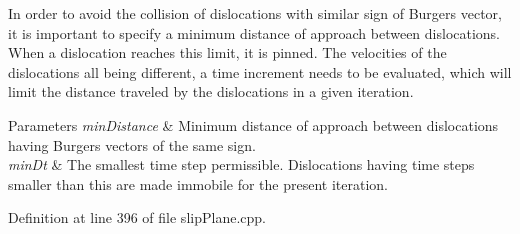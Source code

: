 In order to avoid the collision of dislocations with similar sign of Burgers vector, it is important to specify a minimum distance of approach between dislocations. When a dislocation reaches this limit, it is pinned. The velocities of the dislocations all being different, a time increment needs to be evaluated, which will limit the distance traveled by the dislocations in a given iteration. 
\begin{DoxyParams}{Parameters}
{\em min\-Distance} & Minimum distance of approach between dislocations having Burgers vectors of the same sign. \\
\hline
{\em min\-Dt} & The smallest time step permissible. Dislocations having time steps smaller than this are made immobile for the present iteration. \\
\hline
\end{DoxyParams}


Definition at line 396 of file slip\-Plane.\-cpp.


